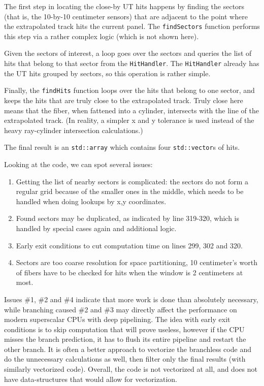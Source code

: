 \documentclass[12pt]{article}
\newcommand{\code}[1]{\texttt{#1}}
\begin{document}
The first step in locating the close-by UT hits happens by finding the sectors (that is, the 10-by-10 centimeter sensors) that are adjacent to the point where the extrapolated track hits the current panel. The \code{findSectors} function performs this step via a rather complex logic (which is not shown here).

Given the sectors of interest, a loop goes over the sectors and queries the list of hits that belong to that sector from the \code{HitHandler}. The \code{HitHandler} already has the UT hits grouped by sectors, so this operation is rather simple.

Finally, the \code{findHits} function loops over the hits that belong to one sector, and keeps the hits that are truly close to the extrapolated track. Truly close here means that the fiber, when fattened into a cylinder, intersects with the line of the extrapolated track. (In reality, a simpler x and y tolerance is used instead of the heavy ray-cylinder intersection calculations.)

The final result is an \code{std::array} which contains four \code{std::vector}s of hits.

\vspace{1pc}

Looking at the code, we can spot several issues:
\begin{enumerate}
	\item Getting the list of nearby sectors is complicated: the sectors do not form a regular grid because of the smaller ones in the middle, which needs to be handled when doing lookups by x,y coordinates.
	\item Found sectors may be duplicated, as indicated by line 319-320, which is handled by special cases again and additional logic.
	\item Early exit conditions to cut computation time on lines 299, 302 and 320.
	\item Sectors are too coarse resolution for space partitioning, 10 centimeter's worth of fibers have to be checked for hits when the window is 2 centimeters at most.
\end{enumerate}

Issues \#1, \#2 and \#4 indicate that more work is done than absolutely necessary, while branching caused \#2 and \#3 may directly affect the performance on modern superscalar CPUs with deep pipelining. The idea with early exit conditions is to skip computation that will prove useless, however if the CPU misses the branch prediction, it has to flush its entire pipeline and restart the other branch. It is often a better approach to vectorize the branchless code and do the unnecessary calculations as well, then filter only the final results (with similarly vectorized code). Overall, the code is not vectorized at all, and does not have data-structures that would allow for vectorization.
\end{document}
